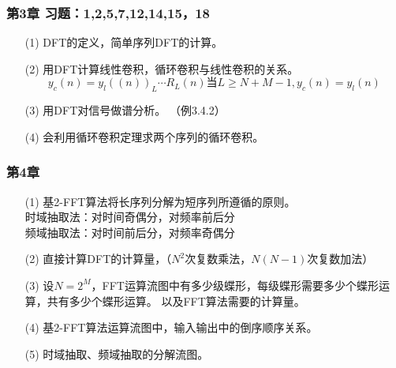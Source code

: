 \documentclass[notheorems,compress,mathserif,table]{beamer}
\begin{document}
%
%
%
\begin{frame}[shrink]\frametitle{第3章  \quad 习题：1,2,5,7,12,14,15，18 }%
\begin{enumerate}
    \item [(1)] DFT的定义，简单序列DFT的计算。
	\item [(2)] 用DFT计算线性卷积，循环卷积与线性卷积的关系。
		\[y_c(n) = y_l((n))_L\cdots R_L(n)  \mbox{当} L\geq N+M-1 , y_c(n) =y_l(n)   \]
	\item [(3)] 用DFT对信号做谱分析。 （例3.4.2）
	\item [(4)] 会利用循环卷积定理求两个序列的循环卷积。

\end{enumerate}
\end{frame}
%
%
%
\begin{frame}[shrink]\frametitle{第4章 }%
\begin{enumerate}
	\item [(1)] 基2-FFT算法将长序列分解为短序列所遵循的原则。\\
	            \qquad 时域抽取法：对时间奇偶分，对频率前后分\\
	            \qquad 频域抽取法：对时间前后分，对频率奇偶分
	\item [(2)] 直接计算DFT的计算量，（$ N^2 $次复数乘法，$ N(N-1) $次复数加法）
	\item [(3)] 设$ N=2^M $，FFT运算流图中有多少级蝶形，每级蝶形需要多少个蝶形运算，共有多少个蝶形运算。
	            以及FFT算法需要的计算量。
	\item [(4)] 基2-FFT算法运算流图中，输入输出中的倒序顺序关系。
	\item [(5)] 时域抽取、频域抽取的分解流图。
\end{enumerate}

\end{frame}
%
%
%
\end{document}
